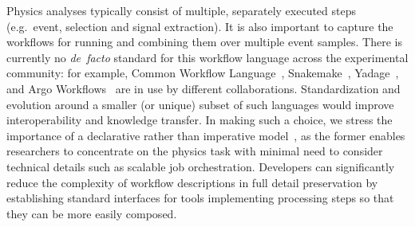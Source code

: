 \documentclass[11pt]{article}
\begin{document}
Physics analyses typically consist of multiple, separately executed steps (e.g.~event, selection and signal extraction). It is also important to capture the workflows for running and combining them over multiple event samples. There is currently no \emph{de~facto} standard for this workflow language across the experimental community: for example, Common Workflow Language~\cite{CWL}, Snakemake~\cite{SnakeMake}, Yadage~\cite{Cranmer:2017frf,yadage_code}, and Argo Workflows~\cite{argo} are in use by different collaborations. Standardization and evolution around a smaller (or unique) subset of such languages would improve interoperability and knowledge transfer. In making such a choice, we stress the importance of a declarative rather than imperative model~\cite{10.3389/fdata.2021.661501}, as the former enables researchers to concentrate on the physics task with minimal need to consider technical details such as scalable job orchestration. Developers can significantly reduce the complexity of workflow descriptions in full detail preservation by establishing standard interfaces for tools implementing processing steps so that they can be more easily composed.




\end{document}
